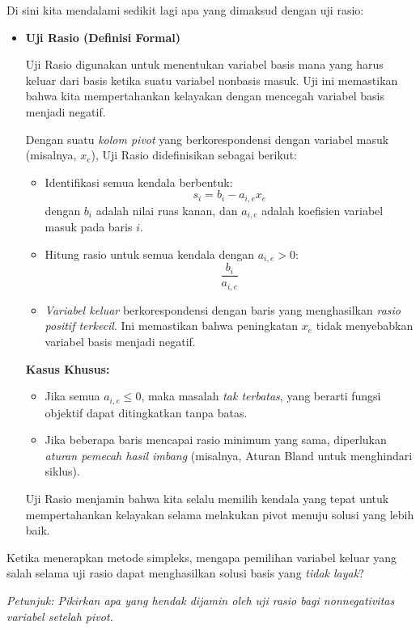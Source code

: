 Di sini kita mendalami sedikit lagi apa yang dimaksud dengan uji rasio:
\begin{itemize}
    \item \textbf{Uji Rasio (Definisi Formal)}  

    Uji Rasio digunakan untuk menentukan variabel basis mana yang harus keluar dari basis ketika suatu variabel nonbasis masuk. Uji ini memastikan bahwa kita mempertahankan kelayakan dengan mencegah variabel basis menjadi negatif.

    Dengan suatu \emph{kolom pivot} yang berkorespondensi dengan variabel masuk (misalnya, \( x_e \)), Uji Rasio didefinisikan sebagai berikut:

    \begin{itemize}
        \item Identifikasi semua kendala berbentuk:
        \[
        s_i = b_i - a_{i,e} x_e
        \]
        dengan \( b_i \) adalah nilai ruas kanan, dan \( a_{i,e} \) adalah koefisien variabel masuk pada baris \( i \).
        \item Hitung rasio untuk semua kendala dengan \( a_{i,e} > 0 \):
        \[
        \frac{b_i}{a_{i,e}}
        \]
        \item \emph{Variabel keluar} berkorespondensi dengan baris yang menghasilkan \emph{rasio positif terkecil}. Ini memastikan bahwa peningkatan \( x_e \) tidak menyebabkan variabel basis menjadi negatif.
    \end{itemize}

    \textbf{Kasus Khusus:}
    \begin{itemize}
        \item Jika semua \( a_{i,e} \leq 0 \), maka masalah \emph{tak terbatas}, yang berarti fungsi objektif dapat ditingkatkan tanpa batas.
        \item Jika beberapa baris mencapai rasio minimum yang sama, diperlukan \emph{aturan pemecah hasil imbang} (misalnya, Aturan Bland untuk menghindari siklus).
    \end{itemize}

    Uji Rasio menjamin bahwa kita selalu memilih kendala yang tepat untuk mempertahankan kelayakan selama melakukan pivot menuju solusi yang lebih baik.
\end{itemize}

\begin{learningcheckpoint}[label={lc:ratio-test}]
Ketika menerapkan metode simpleks, mengapa pemilihan variabel keluar yang salah selama uji rasio dapat menghasilkan solusi basis yang \emph{tidak layak}?

\emph{Petunjuk: Pikirkan apa yang hendak dijamin oleh uji rasio bagi nonnegativitas variabel setelah pivot.}
\end{learningcheckpoint}

